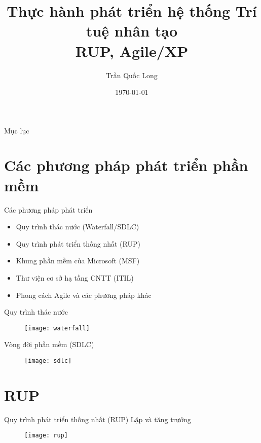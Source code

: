 \documentclass{beamer}
\title{Thực hành phát triển hệ thống Trí tuệ nhân tạo\\
RUP, Agile/XP
}
\author{Trần Quốc Long}
\institute{Trường ĐH Công nghệ, ĐHQG Hà Nội}
\date{\today}
\begin{document}
\begin{frame}
    \titlepage
\end{frame}

\begin{frame}{Mục lục}
    \tableofcontents
\end{frame}

\section{Các phương pháp phát triển phần mềm}

\begin{frame}{Các phương pháp phát triển}
    \begin{itemize}
        \item Quy trình thác nước (Waterfall/SDLC)
        \item Quy trình phát triển thống nhất (RUP)
        \item Khung phần mềm của Microsoft (MSF)
        \item Thư viện cơ sở hạ tầng CNTT (ITIL)
        \item Phong cách Agile và các phương pháp khác
    \end{itemize}
\end{frame}

\begin{frame}{Quy trình thác nước}
    \begin{figure}
        \centering
        \texttt{[image: waterfall]}
    \end{figure}
\end{frame}

\begin{frame}{Vòng đời phần mềm (SDLC)}
    \begin{figure}
        \centering
        \texttt{[image: sdlc]}
    \end{figure}
\end{frame}

\section{RUP}

\begin{frame}{Quy trình phát triển thống nhất (RUP)}
    Lặp và tăng trưởng
    \begin{figure}
        \centering
        \texttt{[image: rup]}
    \end{figure}
\end{frame}
\end{document}
